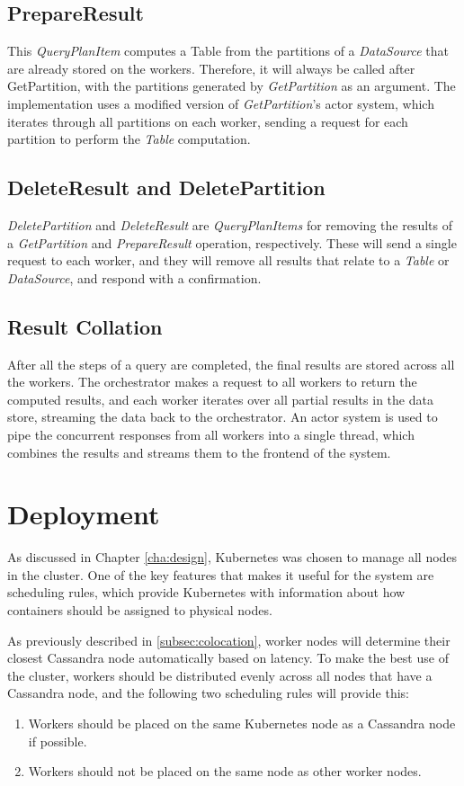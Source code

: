 \subsection{PrepareResult}
This \textit{QueryPlanItem} computes a Table from the partitions of a \textit{DataSource} that are already stored on the workers. Therefore, it will always be called after GetPartition, with the partitions generated by \textit{GetPartition} as an argument. The implementation uses a modified version of \textit{GetPartition}'s actor system, which iterates through all partitions on each worker, sending a request for each partition to perform the \textit{Table} computation.

\subsection{DeleteResult and DeletePartition}

\textit{DeletePartition} and \textit{DeleteResult} are \textit{QueryPlanItems} for removing the results of a \textit{GetPartition} and \textit{PrepareResult} operation, respectively. These will send a single request to each worker, and they will remove all results that relate to a \textit{Table} or \textit{DataSource}, and respond with a confirmation.

\subsection{Result Collation}
After all the steps of a query are completed, the final results are stored across all the workers. The orchestrator makes a request to all workers to return the computed results, and each worker iterates over all partial results in the data store, streaming the data back to the orchestrator. An actor system is used to pipe the concurrent responses from all workers into a single thread, which combines the results and streams them to the frontend of the system.

\section{Deployment}
As discussed in Chapter \ref{cha:design}, Kubernetes was chosen to manage all nodes in the cluster. One of the key features that makes it useful for the system are scheduling rules, which provide Kubernetes with information about how containers should be assigned to physical nodes.

As previously described in \ref{subsec:colocation}, worker nodes will determine their closest Cassandra node automatically based on latency. To make the best use of the cluster, workers should be distributed evenly across all nodes that have a Cassandra node, and the following two scheduling rules will provide this:
\begin{enumerate}
	\item Workers should be placed on the same Kubernetes node as a Cassandra node if possible.
	\item Workers should not be placed on the same node as other worker nodes.
\end{enumerate}

